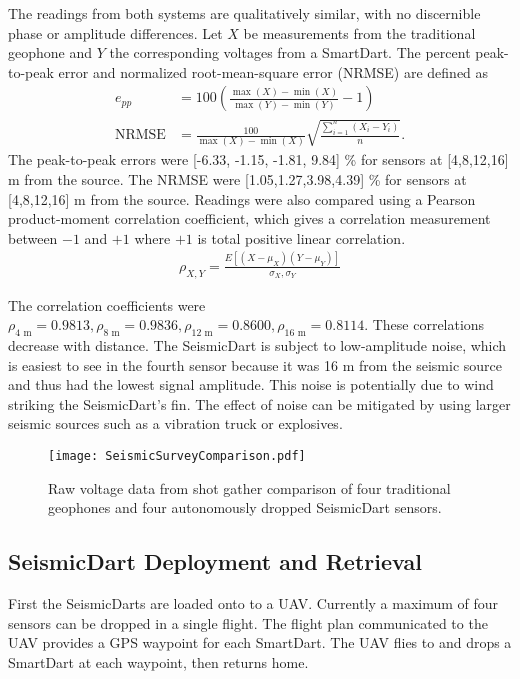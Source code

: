 The readings from both systems are qualitatively similar, with no discernible phase or amplitude differences. Let $X$ be measurements from the traditional geophone and $Y$ the corresponding voltages from a SmartDart.
The percent peak-to-peak error and normalized root-mean-square error (NRMSE) are defined as
\begin{align}
e_{pp} &= 100 \left( \frac{ \max(X) - \min(X) }{ \max(Y) - \min(Y) } -1\right) \\
  \text{NRMSE} &=\frac{100}{\max(X) - \min(X)} \sqrt{ \frac{ \sum_{i=1}^n \left( X_i - Y_i \right)}{n} }.
\end{align}
The peak-to-peak errors were [-6.33, -1.15, -1.81,  9.84] \% for sensors at [4,8,12,16] m from the source.
 The NRMSE were [1.05,1.27,3.98,4.39] \% for sensors at [4,8,12,16] m from the source.
Readings were also compared using a Pearson product-moment correlation coefficient, which gives a correlation measurement between $-1$ and $+1$ where $+1$ is total positive linear correlation.
\begin{align}
\rho_{X,Y} = \frac{E\left[  (X-\mu_X) (Y-\mu_Y)  \right]}{  \sigma_X, \sigma_Y}
\end{align}

The correlation coefficients were $\rho_{\text{4 m}}  =  0.9813, \rho_{\text{8 m}}  =  0.9836, \rho_{\text{12 m}}  =  0.8600, \rho_{\text{16 m}}  = 0.8114$. These correlations decrease with distance. The SeismicDart is subject to low-amplitude noise, which is easiest to see in the fourth sensor because it was 16 m from the seismic source and thus had the lowest signal amplitude.  This noise is potentially due to wind striking the SeismicDart's fin. The effect of noise can be mitigated by using larger seismic sources such as a vibration truck or explosives.



\begin{figure} \centering
  {\texttt{[image: SeismicSurveyComparison.pdf]}}
 \caption{Raw voltage data from shot gather comparison of four traditional geophones and four autonomously dropped SeismicDart sensors.  
 \label{fig:shotgather_auto_drop}}
\end{figure}

\subsection{SeismicDart Deployment and Retrieval}
First the SeismicDarts are loaded onto to a UAV. 
Currently a maximum of four sensors can be dropped in a single flight. 
The flight plan communicated to the UAV provides a GPS waypoint for each SmartDart. 
The UAV flies to and drops a SmartDart at each waypoint, then returns home. 

